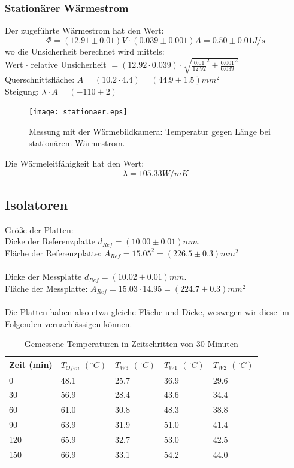 \documentclass[12pt,a4paper,twopage]{article}
\begin{document}
\subsubsection{Stationärer Wärmestrom}
Der zugeführte Wärmestrom hat den Wert:
$$\Phi=(12.91 \pm 0.01)V \cdot (0.039 \pm 0.001)A=0.50 \pm 0.01 J/s$$
wo die Unsicherheit berechnet wird mittels:\\
Wert $\cdot$ relative Unsicherheit $= (12.92 \cdot 0.039) \cdot \sqrt{\frac{0.01}{12.92}^2 + \frac{0.001}{0.039}^2}$\\
Querschnittsfläche: $A=(10.2 \cdot 4.4)=(44.9 \pm 1.5)mm^2$\\
Steigung: $\lambda \cdot A = (-110 \pm 2)$\\
\begin{figure}[H]
\centering
\texttt{[image: stationaer.eps]}
\caption{Messung mit der Wärmebildkamera: Temperatur gegen Länge bei stationärem Wärmestrom.}
\end{figure}


Die Wärmeleitfähigkeit hat den Wert:
$$\boxed{\lambda=105.33 W/m K}$$

\subsection{Isolatoren}
Größe der Platten:\\
Dicke der Referenzplatte $d_{Ref}=(10.00 \pm 0.01)mm$.\\
Fläche der Referenzplatte: $A_{Ref}=15.05^2=(226.5 \pm 0.3)mm^2$\\
\\
Dicke der Messplatte $d_{Ref}=(10.02 \pm 0.01)mm$.\\
Fläche der Messplatte: $A_{Ref}=15.03 \cdot 14.95=(224.7 \pm 0.3)mm^2$\\
\\
Die Platten haben also etwa gleiche Fläche und Dicke, weswegen wir diese im Folgenden vernachlässigen können.\\

\begin{table}[H]
\begin{center}
\begin{tabular}{|l|l|l|l|l|}
\hline
Zeit (min) & $T_{Ofen}$ $(^\circ C)$ & $T_{W3}$ $(^\circ C)
$& $T_{W1}$ $(^\circ C)$ & $T_{W2}$ $(^\circ C)$\\
\hline
0 & 48.1 & 25.7 & 36.9 & 29.6\\
30 & 56.9 & 28.4 & 43.6 & 34.4\\
60 & 61.0 & 30.8 & 48.3 & 38.8\\
90 & 63.9 & 31.9 & 51.0 & 41.4\\
120 & 65.9 & 32.7 & 53.0 & 42.5\\
150 & 66.9 & 33.1 & 54.2 & 44.0\\
\hline
\end{tabular}
\caption{Gemessene Temperaturen in Zeitschritten von 30 Minuten}
\end{center}
\end{table}
\end{document}
